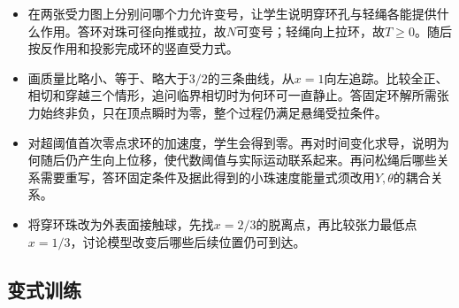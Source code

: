 \documentclass[UTF8,fontset=fandol,a4paper,11pt]{ctexart}
\begin{document}
\begin{itemize}
\item 在两张受力图上分别问哪个力允许变号，让学生说明穿环孔与轻绳各能提供什么作用。答环对珠可径向推或拉，故$N$可变号；轻绳向上拉环，故$T\ge0$。随后按反作用和投影完成环的竖直受力式。
\item 画质量比略小、等于、略大于$3/2$的三条曲线，从$x=1$向左追踪。比较全正、相切和穿越三个情形，追问临界相切时为何环可一直静止。答固定环解所需张力始终非负，只在顶点瞬时为零，整个过程仍满足悬绳受拉条件。
\item 对超阈值首次零点求环的加速度，学生会得到零。再对时间变化求导，说明为何随后仍产生向上位移，使代数阈值与实际运动联系起来。再问松绳后哪些关系需要重写，答环固定条件及据此得到的小珠速度能量式须改用$Y,\theta$的耦合关系。
\item 将穿环珠改为外表面接触球，先找$x=2/3$的脱离点，再比较张力最低点$x=1/3$，讨论模型改变后哪些后续位置仍可到达。
\end{itemize}



\subsection*{变式训练}
\end{document}

